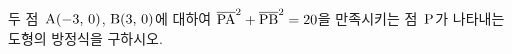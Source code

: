 두 점~$\mathrm{A}(-3,\mkern3mu 0)$, $\mathrm{B}(3,\mkern3mu 0)$에 대하여 $\overline{\mathrm{PA}}^2+\overline{\mathrm{PB}}^2=20$을 만족시키는 점~$\mathrm{P}$가 나타내는 도형의 방정식을 구하시오.
